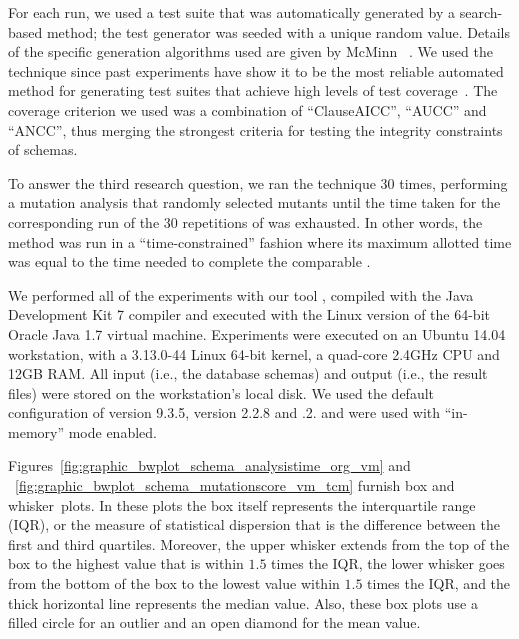 


For each run, we used a test suite that was automatically generated by a search-based method; the test generator was seeded with a unique random value. Details of the specific generation algorithms used are given by McMinn \etal~\cite{McMinn2015}. We used the \AVM technique since past experiments have show it to be the most reliable automated method for generating test suites that achieve high levels of test coverage~\cite{McMinn2015}. The coverage criterion we used was a combination of ``ClauseAICC'', ``AUCC'' and ``ANCC'', thus merging the strongest criteria for testing the integrity constraints of schemas.


To answer the third research question, we ran the \Original technique $30$ times, performing a mutation analysis that randomly selected mutants until the time taken for the corresponding run of the $30$ repetitions of \vma was exhausted. In other words, the \Original method was run in a ``time-constrained'' fashion where its maximum allotted time was equal to the time needed to complete the comparable \vma.


We performed all of the experiments with our \SA tool \cite{Kapfhammer2013,McMinn2015,Wright2014}, compiled with the Java Development Kit 7 compiler and executed with the Linux version of the 64-bit Oracle Java 1.7 virtual machine.  Experiments were executed on an Ubuntu 14.04 workstation, with a 3.13.0-44 Linux 64-bit kernel, a quad-core 2.4GHz CPU and 12GB RAM. All input (i.e., the database schemas) and output (i.e., the result files) were stored on the workstation's local disk. We used the default configuration of \PostgreSQL version 9.3.5, \HyperSQL version 2.2.8 and .2.  \HyperSQL and \SQLite were used with ``in-memory'' mode enabled.




 Figures~\ref{fig:graphic_bwplot_schema_analysistime_org_vm} and ~\ref{fig:graphic_bwplot_schema_mutationscore_vm_tcm} furnish box and \mbox{whisker plots}.  In these plots the box itself represents the interquartile range (IQR), or the measure of statistical dispersion that is the difference between the first and third quartiles. Moreover, the upper whisker extends from the top of the box to the highest value that is within $1.5$ times the IQR, the lower whisker goes from the bottom of the box to the lowest value within $1.5$ times the IQR, and the thick horizontal line represents the median value. Also, these box plots use a filled circle for an outlier and an open diamond for the mean value.


